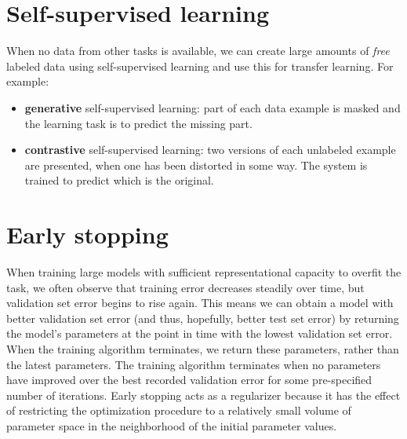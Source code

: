 \section{Self-supervised learning}
When no data from other tasks is available, we can create large amounts of \textit{free} labeled data using self-supervised learning and use this for transfer learning. For example:
\begin{itemize}
    \item \textbf{generative} self-supervised learning: part of each data example is masked and the learning task is to predict the missing part.

    \item \textbf{contrastive} self-supervised learning: two versions of each unlabeled example are presented, when one has been distorted in some way. The system is trained to predict which is the original.
\end{itemize}

\section{Early stopping}
When training large models with sufficient representational capacity to overfit
the task, we often observe that training error decreases steadily over time, but
validation set error begins to rise again. This means we can obtain a model with better validation set error (and thus, hopefully, better test set error) by returning the model's parameters at the point in time with the lowest validation set error. When the training algorithm terminates, we return these parameters, rather than the latest parameters. The training algorithm terminates when no parameters have improved over the best recorded validation error for some pre-specified number of iterations.\newline\newline
Early stopping acts as a regularizer because it has the effect of
restricting the optimization procedure to a relatively small volume of parameter space in the neighborhood of the initial parameter values.

